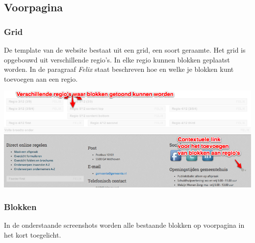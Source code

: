 
\subsection{Voorpagina}\label{voorpagina}


\subsubsection{Grid}

De template van de website bestaat uit een grid, een soort geraamte. Het grid is opgebouwd uit verschillende regio's. In elke regio kunnen blokken geplaatst worden. In de paragraaf \emph{Felix} staat beschreven hoe en welke je blokken kunt toevoegen aan een regio. 

\bigskip

\begin{center}
	\includegraphics[width=\textwidth]{img/grid1.png}
\end{center}


\subsubsection{Blokken}

In de onderstaande screenshots worden alle bestaande blokken op voorpagina in het kort toegelicht.

\bigskip

